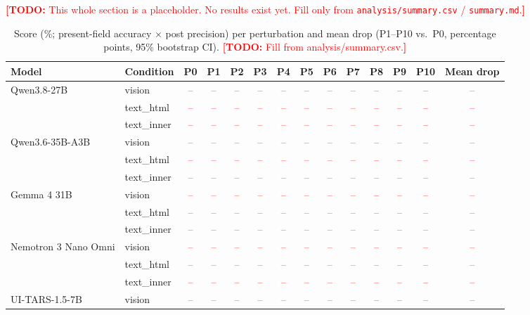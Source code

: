 \documentclass[letterpaper,10pt,twocolumn]{article}
\newcommand{\todo}[1]{\textcolor{red}{\textbf{[TODO:} #1\textbf{]}}}
\newcommand{\cell}{\textcolor{red}{--}}
\begin{document}
\todo{This whole section is a placeholder. No results exist yet. Fill only from
\texttt{analysis/summary.csv} / \texttt{summary.md}.}

\begin{table}[t]
\centering\footnotesize
\setlength{\tabcolsep}{3.2pt}
\caption{Score (\%; present-field accuracy $\times$ post precision) per
perturbation and mean drop (P1--P10 vs.\ P0,
percentage points, 95\% bootstrap CI). \todo{Fill from analysis/summary.csv.}}
\label{tab:results}
\begin{tabular}{@{}llccccccccccc c@{}}
\toprule
Model & Condition & P0 & P1 & P2 & P3 & P4 & P5 & P6 & P7 & P8 & P9 & P10 & Mean drop \\
\midrule
\multirow{3}{*}{Qwen3.8-27B}
 & vision      & \cell&\cell&\cell&\cell&\cell&\cell&\cell&\cell&\cell&\cell&\cell&\cell\\
 & text\_html  & \cell&\cell&\cell&\cell&\cell&\cell&\cell&\cell&\cell&\cell&\cell&\cell\\
 & text\_inner & \cell&\cell&\cell&\cell&\cell&\cell&\cell&\cell&\cell&\cell&\cell&\cell\\
\midrule
\multirow{3}{*}{Qwen3.6-35B-A3B}
 & vision      & \cell&\cell&\cell&\cell&\cell&\cell&\cell&\cell&\cell&\cell&\cell&\cell\\
 & text\_html  & \cell&\cell&\cell&\cell&\cell&\cell&\cell&\cell&\cell&\cell&\cell&\cell\\
 & text\_inner & \cell&\cell&\cell&\cell&\cell&\cell&\cell&\cell&\cell&\cell&\cell&\cell\\
\midrule
\multirow{3}{*}{Gemma 4 31B}
 & vision      & \cell&\cell&\cell&\cell&\cell&\cell&\cell&\cell&\cell&\cell&\cell&\cell\\
 & text\_html  & \cell&\cell&\cell&\cell&\cell&\cell&\cell&\cell&\cell&\cell&\cell&\cell\\
 & text\_inner & \cell&\cell&\cell&\cell&\cell&\cell&\cell&\cell&\cell&\cell&\cell&\cell\\
\midrule
\multirow{3}{*}{Nemotron 3 Nano Omni}
 & vision      & \cell&\cell&\cell&\cell&\cell&\cell&\cell&\cell&\cell&\cell&\cell&\cell\\
 & text\_html  & \cell&\cell&\cell&\cell&\cell&\cell&\cell&\cell&\cell&\cell&\cell&\cell\\
 & text\_inner & \cell&\cell&\cell&\cell&\cell&\cell&\cell&\cell&\cell&\cell&\cell&\cell\\
\midrule
\multirow{3}{*}{UI-TARS-1.5-7B}
 & vision      & \cell&\cell&\cell&\cell&\cell&\cell&\cell&\cell&\cell&\cell&\cell&\cell\\

\end{tabular}
\end{table}
\end{document}
